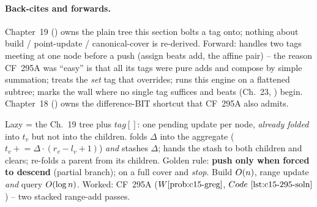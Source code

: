 \paragraph{Back-cites and forwards.}
Chapter~19 () owns the plain tree this section bolts a tag onto; nothing about build / point-update / canonical-cover is re-derived.  Forward:  handles two tags meeting at one node before a push (assign beats add, the affine pair) -- the reason CF~295A was ``easy'' is that all its tags were pure adds and compose by simple summation;  treats the \emph{set} tag that overrides;  runs this engine on a flattened subtree;  marks the wall where no single tag suffices and beats (Ch.~23, ) begin.  Chapter~18 () owns the difference-BIT shortcut that CF~295A also admits.

\begin{recallbox}
Lazy = the Ch.~19 tree plus \(\mathit{tag}[]\): one pending update per node, \emph{already folded} into \(t_v\) but not into the children.   folds \(\Delta\) into the aggregate (\(t_v\mathrel{+}=\Delta\cdot(r_v-l_v+1)\)) \emph{and} stashes \(\Delta\);  hands the stash to both children and clears;  re-folds a parent from its children.  Golden rule: \textbf{push only when forced to descend} (partial branch); on a full cover  and \emph{stop}.  Build \(O(n)\), range update \emph{and} query \(O(\log n)\).  Worked: CF~295A (\(\probref{c15-greg}\), \(\coderef{c15-295-soln}\)) -- two stacked range-add passes.
\end{recallbox}
